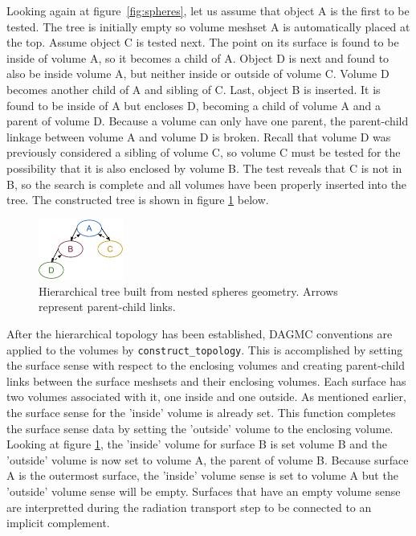 \documentclass{anstrans}
\begin{document}
Looking again at figure~\ref{fig:spheres}, let us assume that object A is the
first to be tested. The tree is initially empty so volume meshset A is
automatically placed at the top.  Assume object C is tested next.  The point
on its surface is found to be inside of volume A, so it becomes a child of A.
Object D is next and found to also be inside volume A, but neither inside or
outside of volume C.  Volume D becomes another child of A and sibling of C.
Last, object B is inserted. It is found to be inside of A but encloses D,
becoming a child of volume A and a parent of volume D. Because a volume can
only have one parent, the parent-child linkage between volume A and volume D
is broken.  Recall that volume D was previously considered a sibling of volume C,
so volume C must be tested for the possibility that it is also enclosed by
volume B. The test reveals that C is not in B, so the search is complete and all
volumes have been properly inserted into the tree.  
The constructed tree is shown in figure \ref{fig:tree} below.

\begin{figure}[ht] %
  \centering
  \includegraphics[width=0.25\textwidth]{../figs/tree.png}
  \caption{Hierarchical tree built from nested spheres geometry.  Arrows represent parent-child links.}
  \label{fig:tree}
\end{figure}

After the hierarchical topology has been established, DAGMC conventions are
applied to the volumes by \texttt{construct\_topology}.  This is accomplished
by setting the surface sense with respect to the enclosing volumes and
creating parent-child links between the surface meshsets and their enclosing
volumes.  Each surface has two volumes associated with it, one inside and one
outside.  As mentioned earlier, the surface sense for the 'inside' volume is
already set.  This function completes the surface sense data by setting the
'outside' volume to the enclosing volume.  Looking at figure \ref{fig:tree},
the 'inside' volume for surface B is set volume B and the 'outside' volume is
now set to volume A, the parent of volume B.  Because surface A is the
outermost surface, the 'inside' volume sense is set to volume A but the
'outside' volume sense will be empty.  Surfaces that have an empty volume
sense are interpretted during the radiation transport step to be connected to
an implicit complement.
\end{document}
